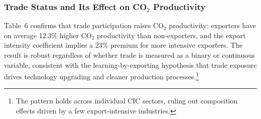 \documentclass[11pt,a4paper]{article}
\begin{document}
\subsubsection{Trade Status and Its Effect on CO$_2$ Productivity}

Table~6 confirms that trade participation raises CO$_2$ productivity: exporters have on average 12.3\% higher CO$_2$ productivity than non-exporters, and the export intensity coefficient implies a 23\% premium for more intensive exporters. The result is robust regardless of whether trade is measured as a binary or continuous variable, consistent with the learning-by-exporting hypothesis that trade exposure drives technology upgrading and cleaner production processes.\footnote{The pattern holds across individual CIC sectors, ruling out composition effects driven by a few export-intensive industries.}
\end{document}
